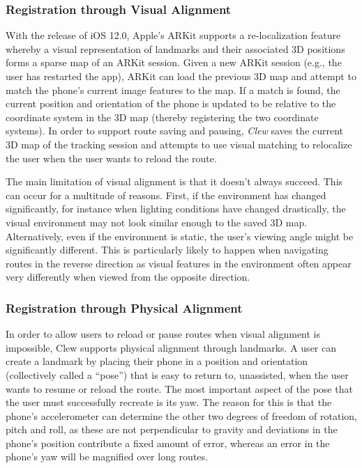 \documentclass[chi_draft]{sigchi}
\begin{document}
\subsubsection{Registration through Visual Alignment}
With the release of iOS 12.0, Apple's ARKit supports a re-localization feature whereby a visual representation of landmarks and their associated 3D positions forms a sparse map of an ARKit session.  Given a new ARKit session (e.g., the user has restarted the app), ARKit can load the previous 3D map and attempt to match the phone's current image features to the map.  If a match is found, the current position and orientation of the phone is updated to be relative to the coordinate system in the 3D map (thereby registering the two coordinate systems).  In order to support route saving and pausing, \emph{Clew} saves the current 3D map of the tracking session and attempts to use visual matching to relocalize the user when the user wants to reload the route.

The main limitation of visual alignment is that it doesn't always succeed.  This can occur for a multitude of reasons.  First, if the environment has changed significantly, for instance when lighting conditions have changed drastically, the visual environment may not look similar enough to the saved 3D map.  Alternatively, even if the environment is static, the user's viewing angle might be significantly different.  This is particularly likely to happen when navigating routes in the reverse direction as visual features in the environment often appear very differently when viewed from the opposite direction.


\subsubsection{Registration through Physical Alignment}

In order to allow users to reload or pause routes when visual alignment is impossible, Clew supports physical alignment through landmarks.  A user can create a landmark by placing their phone in a position and orientation (collectively called a ``pose'') that is easy to return to, unassisted, when the user wants to resume or reload the route.  The most important aspect of the pose that the user must successfully recreate is its yaw.  The reason for this is that the phone's accelerometer can determine the other two degrees of freedom of rotation, pitch and roll, as these are not perpendicular to gravity and deviations in the phone's position contribute a fixed amount of error, whereas an error in the phone's yaw will be magnified over long routes.
\end{document}
